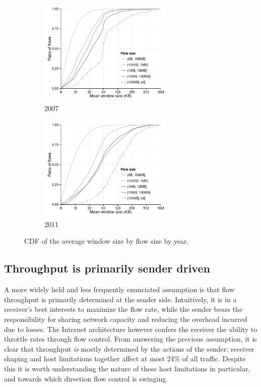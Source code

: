 \begin{figure}
    \begin{subfigure}[b]{.5\linewidth}
        \centering
        \includegraphics[width=2.5in]{figures/malawi/windowsize2007}
        \caption{2007}
    \end{subfigure}%
    \begin{subfigure}[b]{.5\linewidth}
        \centering
        \includegraphics[width=2.5in]{figures/malawi/windowsize2011}
        \caption{2011}
    \end{subfigure}%
    \caption{CDF of the average window size by flow size by year. \label{fig:windowsize}}
\end{figure}
 

\subsection{Throughput is primarily sender driven}

A more widely held and less frequently enunciated assumption is that flow throughput is primarily determined at the sender side. Intuitively, it is in a receiver's best interests to maximize the flow rate, while the sender bears the responsibility for sharing network capacity and reducing the overhead incurred due to losses. The Internet architecture however confers the receiver the ability to throttle rates through flow control. From answering the previous assumption, it is clear that throughput \textit{is} mostly determined by the actions of the sender: receiver shaping and host limitations together affect at most 24\% of all traffic. Despite this it is worth understanding the nature of these host limitations in particular, and towards which direction flow control is swinging.

